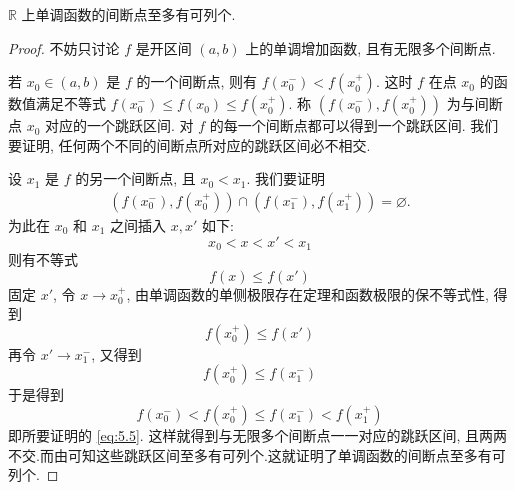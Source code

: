 \documentclass[../../main.tex]{subfiles}%
\begin{document}
\begin{proposition}\label{proposition:实轴上单调函数至多有可列个间断点}
$\mathbb{R}$ 上单调函数的间断点至多有可列个.
\end{proposition}
\begin{proof}

不妨只讨论 \( f \) 是开区间 \( (a,b) \) 上的单调增加函数, 且有无限多个间断点.

若 \( x_0 \in (a,b) \) 是 \( f \) 的一个间断点, 则有 \( f(x_0^-) < f(x_0^+) \). 这时 \( f \) 在点 \( x_0 \) 的函数值满足不等式 \( f(x_0^-) \leqslant f(x_0) \leqslant f(x_0^+) \). 称 \( (f(x_0^-), f(x_0^+)) \) 为与间断点 \( x_0 \) 对应的一个跳跃区间.
对 \( f \) 的每一个间断点都可以得到一个跳跃区间. 我们要证明, 任何两个不同的间断点所对应的跳跃区间必不相交.

设 \( x_1 \) 是 \( f \) 的另一个间断点, 且 \( x_0 < x_1 \). 我们要证明
\begin{align} \label{eq:5.5}
(f(x_0^-), f(x_0^+)) \cap (f(x_1^-), f(x_1^+)) = \varnothing.
\end{align}
为此在 \( x_0 \) 和 \( x_1 \) 之间插入 \( x, x' \) 如下:
\[
x_0 < x < x' < x_1
\]
则有不等式
\[
f(x) \leqslant f(x')
\]
固定 \( x' \), 令 \( x \to x_0^+ \), 由单调函数的单侧极限存在定理和函数极限的保不等式性, 得到
\[
f(x_0^+) \leqslant f(x')
\]
再令 \( x' \to x_1^- \), 又得到
\[
f(x_0^+) \leqslant f(x_1^-)
\]
于是得到
\[
f(x_0^-) < f(x_0^+) \leqslant f(x_1^-) < f(x_1^+)
\]
即所要证明的 \eqref{eq:5.5}.
这样就得到与无限多个间断点一一对应的跳跃区间, 且两两不交.而由可知这些跳跃区间至多有可列个.这就证明了单调函数的间断点至多有可列个.

\end{proof}
\end{document}
